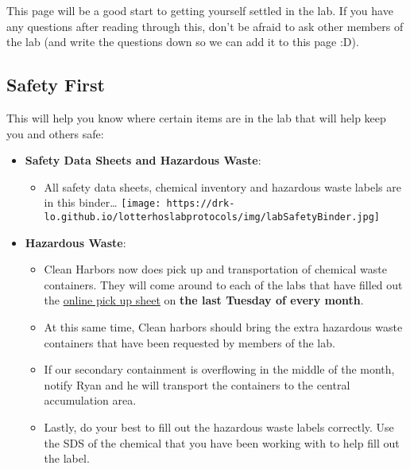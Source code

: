 \documentclass[
  letterpaper,
  DIV=11,
  numbers=noendperiod]{scrreprt}
\providecommand{\tightlist}{%
  \setlength{\itemsep}{0pt}\setlength{\parskip}{0pt}}\usepackage{longtable,booktabs,array}
\begin{document}
This page will be a good start to getting yourself settled in the lab.
If you have any questions after reading through this, don't be afraid to
ask other members of the lab (and write the questions down so we can add
it to this page :D).

\hypertarget{safety-first}{%
\subsection*{\texorpdfstring{\textbf{Safety
First}}{Safety First}}\label{safety-first}}

This will help you know where certain items are in the lab that will
help keep you and others safe:

\begin{itemize}
\item
  \textbf{Safety Data Sheets and Hazardous Waste}:

  \begin{itemize}
  \tightlist
  \item
    All safety data sheets, chemical inventory and hazardous waste
    labels are in this binder\ldots{}
    \texttt{[image: https://drk-lo.github.io/lotterhoslabprotocols/img/labSafetyBinder.jpg]}
  \end{itemize}
\item
  \textbf{Hazardous Waste}:

  \begin{itemize}
  \item
    Clean Harbors now does pick up and transportation of chemical waste
    containers. They will come around to each of the labs that have
    filled out the \href{https://ehsa.nunet.neu.edu/neu_wp}{online pick
    up sheet} on \textbf{the last Tuesday of every month}.
  \item
    At this same time, Clean harbors should bring the extra hazardous
    waste containers that have been requested by members of the lab.
  \item
    If our secondary containment is overflowing in the middle of the
    month, notify Ryan and he will transport the containers to the
    central accumulation area.
  \item
    Lastly, do your best to fill out the hazardous waste labels
    correctly. Use the SDS of the chemical that you have been working
    with to help fill out the label.
  \end{itemize}
\end{itemize}
\end{document}
